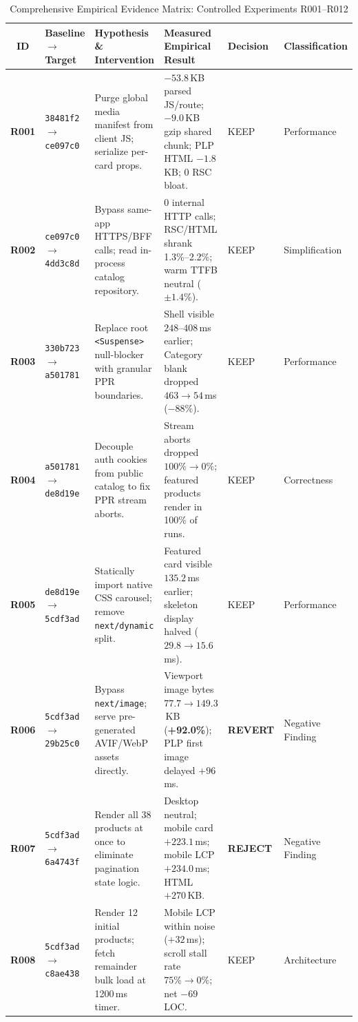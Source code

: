 \documentclass[conference]{IEEEtran}
\begin{document}
\begin{table}[t]
\caption{Comprehensive Empirical Evidence Matrix: Controlled Experiments R001--R012}
\label{tab:evidence_matrix}
\centering
\begin{tabular}{@{}clp{4.8cm}p{5.5cm}ll@{}}
\toprule
\textbf{ID} & \textbf{Baseline $\to$ Target} & \textbf{Hypothesis \& Intervention} & \textbf{Measured Empirical Result} & \textbf{Decision} & \textbf{Classification} \\
\midrule
\textbf{R001} & \texttt{38481f2} $\to$ \texttt{ce097c0} & Purge global media manifest from client JS; serialize per-card props. & $-53.8$\,KB parsed JS/route; $-9.0$\,KB gzip shared chunk; PLP HTML $-1.8$\,KB; 0 RSC bloat. & KEEP & Performance \\
\textbf{R002} & \texttt{ce097c0} $\to$ \texttt{4dd3c8d} & Bypass same-app HTTPS/BFF calls; read in-process catalog repository. & 0 internal HTTP calls; RSC/HTML shrank 1.3\%--2.2\%; warm TTFB neutral ($\pm 1.4\%$). & KEEP & Simplification \\
\textbf{R003} & \texttt{330b723} $\to$ \texttt{a501781} & Replace root \texttt{<Suspense>} null-blocker with granular PPR boundaries. & Shell visible $248$--$408$\,ms earlier; Category blank dropped $463 \to 54$\,ms ($-88\%$). & KEEP & Performance \\
\textbf{R004} & \texttt{a501781} $\to$ \texttt{de8d19e} & Decouple auth cookies from public catalog to fix PPR stream aborts. & Stream aborts dropped $100\% \to 0\%$; featured products render in 100\% of runs. & KEEP & Correctness \\
\textbf{R005} & \texttt{de8d19e} $\to$ \texttt{5cdf3ad} & Statically import native CSS carousel; remove \texttt{next/dynamic} split. & Featured card visible $135.2$\,ms earlier; skeleton display halved ($29.8 \to 15.6$\,ms). & KEEP & Performance \\
\textbf{R006} & \texttt{5cdf3ad} $\to$ \texttt{29b25c0} & Bypass \texttt{next/image}; serve pre-generated AVIF/WebP assets directly. & Viewport image bytes $77.7 \to 149.3$\,KB (\textbf{+92.0\%}); PLP first image delayed $+96$\,ms. & \textbf{REVERT} & Negative Finding \\
\textbf{R007} & \texttt{5cdf3ad} $\to$ \texttt{6a4743f} & Render all 38 products at once to eliminate pagination state logic. & Desktop neutral; mobile card $+223.1$\,ms; mobile LCP $+234.0$\,ms; HTML $+270$\,KB. & \textbf{REJECT} & Negative Finding \\
\textbf{R008} & \texttt{5cdf3ad} $\to$ \texttt{c8ae438} & Render 12 initial products; fetch remainder bulk load at 1200\,ms timer. & Mobile LCP within noise ($+32$\,ms); scroll stall rate $75\% \to 0\%$; net $-69$ LOC. & KEEP & Architecture \\

\end{tabular}
\end{table}
\end{document}
